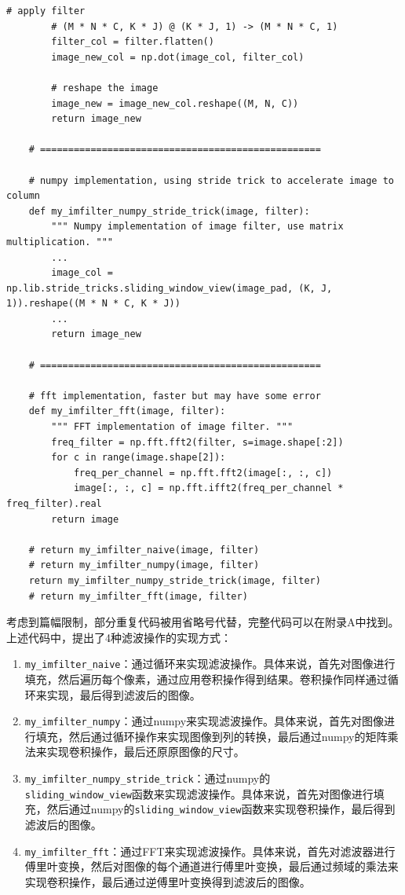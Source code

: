 \documentclass{article}
\begin{document}
\begin{lstlisting}[style=Python]
        # apply filter
        # (M * N * C, K * J) @ (K * J, 1) -> (M * N * C, 1)
        filter_col = filter.flatten()
        image_new_col = np.dot(image_col, filter_col)
        
        # reshape the image
        image_new = image_new_col.reshape((M, N, C))
        return image_new

    # ==================================================

    # numpy implementation, using stride trick to accelerate image to column
    def my_imfilter_numpy_stride_trick(image, filter):
        """ Numpy implementation of image filter, use matrix multiplication. """
        ...
        image_col = np.lib.stride_tricks.sliding_window_view(image_pad, (K, J, 1)).reshape((M * N * C, K * J))
        ...
        return image_new

    # ==================================================
    
    # fft implementation, faster but may have some error
    def my_imfilter_fft(image, filter):
        """ FFT implementation of image filter. """
        freq_filter = np.fft.fft2(filter, s=image.shape[:2])
        for c in range(image.shape[2]):
            freq_per_channel = np.fft.fft2(image[:, :, c])
            image[:, :, c] = np.fft.ifft2(freq_per_channel * freq_filter).real
        return image
    
    # return my_imfilter_naive(image, filter)
    # return my_imfilter_numpy(image, filter)
    return my_imfilter_numpy_stride_trick(image, filter)
    # return my_imfilter_fft(image, filter)
\end{lstlisting}

考虑到篇幅限制，部分重复代码被用省略号代替，完整代码可以在附录A中找到。上述代码中，提出了4种滤波操作的实现方式：

\begin{enumerate}
    \item \texttt{my\_imfilter\_naive}：通过循环来实现滤波操作。具体来说，首先对图像进行填充，然后遍历每个像素，通过应用卷积操作得到结果。卷积操作同样通过循环来实现，最后得到滤波后的图像。
    \item \texttt{my\_imfilter\_numpy}：通过numpy来实现滤波操作。具体来说，首先对图像进行填充，然后通过循环操作来实现图像到列的转换，最后通过numpy的矩阵乘法来实现卷积操作，最后还原原图像的尺寸。
    \item \texttt{my\_imfilter\_numpy\_stride\_trick}：通过numpy的\\ \texttt{sliding\_window\_view}函数来实现滤波操作。具体来说，首先对图像进行填充，然后通过numpy的\texttt{sliding\_window\_view}函数来实现卷积操作，最后得到滤波后的图像。
    \item \texttt{my\_imfilter\_fft}：通过FFT来实现滤波操作。具体来说，首先对滤波器进行傅里叶变换，然后对图像的每个通道进行傅里叶变换，最后通过频域的乘法来实现卷积操作，最后通过逆傅里叶变换得到滤波后的图像。
\end{enumerate}
\end{document}
